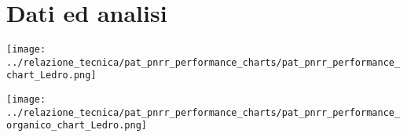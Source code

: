 \documentclass[a4paper]{article}
\begin{document}
	\section{Dati ed analisi}
	
	\begin{center}
		\texttt{[image: ../relazione\_tecnica/pat\_pnrr\_performance\_charts/pat\_pnrr\_performance\_chart\_Ledro.png]}
	\end{center}
	\begin{center}
		\texttt{[image: ../relazione\_tecnica/pat\_pnrr\_performance\_charts/pat\_pnrr\_performance\_organico\_chart\_Ledro.png]}
	\end{center}
\end{document}
